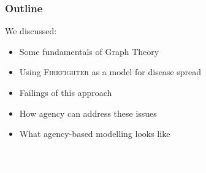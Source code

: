 \documentclass[unknownkeysallowed]{beamer}
\begin{document}
\begin{frame}
\frametitle{Outline}
\tableofcontents[currentsection]
\end{frame}


\begin{frame}

We discussed:

\begin{itemize}
	\pause
	\item Some fundamentals of Graph Theory
	\pause
	\item Using {\scshape Firefighter} as a model for disease spread
	\pause
	\item Failings of this approach
	\pause
	\item How agency can address these issues
	\pause
	\item What agency-based modelling looks like
\end{itemize}

\end{frame}

%
%


{

  \begin{frame}[plain]

    \begin{columns}

      \begin{column}[l]{5cm}
      \end{column}

      \begin{column}[r]{5cm}
        \textcolor{white}{
          Questions?
        }
      \end{column}

    \end{columns}
  \end{frame}
}
\end{document}
